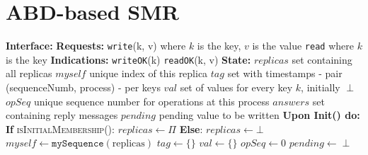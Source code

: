 \documentclass[10pt,a4paper,twocolumn]{article}
\begin{document}
\section{ABD-based SMR}
\label{code:ABDSMR}
\begin{algorithm}
	\caption{Key-Value Store Replication Using Majority Quorums (State \& Init)}
	\begin{algorithmic}
		\State \textbf{Interface:}
		\State \hspace{1em} \textbf{Requests:}
		\State \hspace{2em} \texttt{write}(k, v) {where $k$ is the key, $v$ is the value}
		\State \hspace{2em} \texttt{read} {where $k$ is the key}
		\State \hspace{1em} \textbf{Indications:}
		\State \hspace{2em} \texttt{writeOK}(k)
		\State \hspace{2em} \texttt{readOK}(k, v)
		\State
		\State \textbf{State:}
		\State \hspace{1em} $replicas$ {set containing all replicas}
		\State \hspace{1em} $myself$ {unique index of this replica}
		\State \hspace{1em} $tag$ {set with timestamps - pair (sequenceNumb, process) - per keys}
		\State \hspace{1em} $val$ {set of values for every key $k$, initially $\perp$}
		\State \hspace{1em} $opSeq$ {unique sequence number for operations at this process}
		\State \hspace{1em} $answers$ {set containing reply messages}
		\State \hspace{1em} $pending$ {pending value to be written}
		\State
		\State \textbf{Upon Init() do:}
		\State \hspace{1em} \textbf{If} \textsc{isInitialMembership()}:
		\State \hspace{3em} $replicas \leftarrow \Pi$
		\State \hspace{1em} \textbf{Else}:
		\State \hspace{3em} $replicas \leftarrow \bot$
		\State \hspace{1em} $myself \leftarrow \texttt{mySequence}(\text{replicas})$
		\State \hspace{1em} $tag \leftarrow \{\}$
		\State \hspace{1em} $val \leftarrow \{\}$
		\State \hspace{1em} $opSeq \leftarrow 0$
		\State \hspace{1em} $pending \leftarrow \perp$
	\end{algorithmic}
\end{algorithm}
\end{document}
